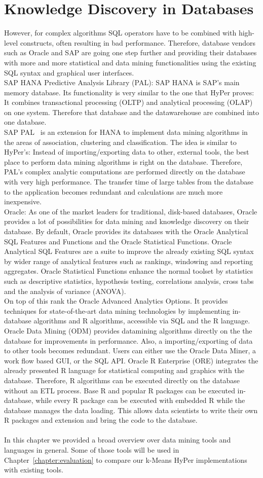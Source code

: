 \section{Knowledge Discovery in Databases}
However, for complex algorithms SQL operators have to be combined with high-level constructs, often resulting in bad performance. Therefore, database vendors such as Oracle and SAP are going one step further and providing their databases with more and more statistical and data mining functionalities using the existing SQL syntax and graphical user interfaces.
\\
SAP HANA Predictive Analysis Library (PAL): SAP HANA is SAP's main memory database. Its functionality is very similar to the one that HyPer proves: It combines transactional processing (OLTP) and analytical processing (OLAP) on one system. Therefore that database and the datawarehouse are combined into one database. 
\\
SAP PAL~\parencite{pal} is an extension for HANA to implement data mining algorithms in the areas of association, clustering and classification. The idea is similar to HyPer's: Instead of importing/exporting data to other, external tools, the best place to perform data mining algorithms is right on the database. Therefore, PAL's complex analytic computations are performed directly on the database with very high performance. The transfer time of large tables from the database to the application becomes redundant and calculations are much more inexpensive.
\\
Oracle: As one of the market leaders for traditional, disk-based databases, Oracle provides a lot of possibilities for data mining and knowledge discovery on their database. By default, Oracle provides its databases with the Oracle Analytical SQL Features and Functions and the Oracle Statistical Functions. Oracle Analytical SQL Features are a suite to improve the already existing SQL syntax by wider range of analytical features such as rankings, windowing and reporting aggregates. Oracle Statistical Functions enhance the normal toolset by statistics such as descriptive statistics, hypothesis testing, correlations analysis, cross tabs and the analysis of variance (ANOVA). 
\\
On top of this rank the Oracle Advanced Analytics Options. It provides techniques for state-of-the-art data mining technologies by implementing in-database algorithms and R algorithms, accessible via SQL and the R language. Oracle Data Mining (ODM) provides datamining algorithms directly on the the database for improvements in performance. Also, a importing/exporting of data to other tools becomes redundant. Users can either use the Oracle Data Miner, a work flow based GUI, or the SQL API. Oracle R Enterprise (ORE) integrates the already presented R language for statistical computing and graphics with the database. Therefore, R algorithms can be executed directly on the database without an ETL process. Base R and popular R packages can be executed in-database, while every R package can be executed with embedded R while the database manages the data loading. This allows data scientists to write their own R packages and extension and bring the code to the database.
\\
\\
In this chapter we provided a broad overview over data mining tools and languages in general. Some of those tools will be used in Chapter~\ref{chapter:evaluation} to compare our k-Means HyPer implementations with existing tools.

